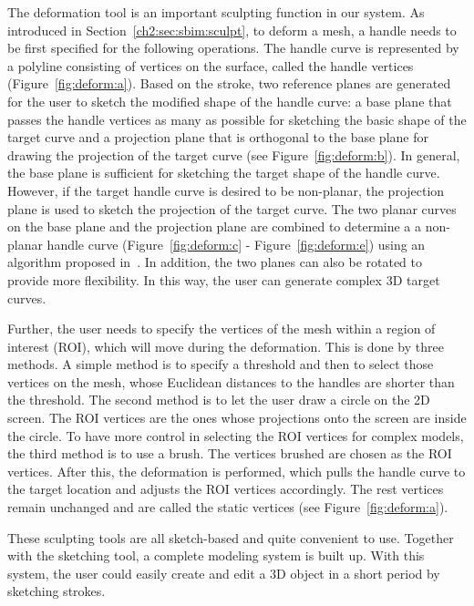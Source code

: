 The deformation tool is an important  sculpting function in our
system. As introduced in Section~\ref{ch2:sec:sbim:sculpt}, to
deform a mesh, a handle needs to be first specified for the
following operations. The handle curve is represented by a polyline 
consisting of vertices on the surface, called the handle vertices
(Figure~\ref{fig:deform:a}). Based on the stroke, two reference
planes are generated for the user to sketch the modified shape of
the handle curve: a base plane that passes the handle vertices as
many as possible for sketching the basic shape of the target curve
and a projection plane that is orthogonal to the base plane for
drawing the projection of the target curve (see
Figure~\ref{fig:deform:b}). In general, the base plane is sufficient
for sketching the target shape of the handle curve. However, if the
target handle curve is desired to be non-planar, the projection
plane is used to sketch the projection of the target curve. The two
planar curves on the base plane and the projection plane are
combined to determine a a non-planar handle curve
(Figure~\ref{fig:deform:c} - Figure~\ref{fig:deform:e}) using an
algorithm proposed in~\cite{CMZHB99}. In addition,  the two planes
can also be rotated to provide more flexibility. In this way, the
user can generate complex 3D target curves.

Further, the user needs to specify the vertices of the mesh within a
region of interest (ROI), which will move during the deformation.
This is done by three methods. A simple method is to specify a
threshold and  then to select those vertices on the mesh, whose
Euclidean distances to the handles are shorter than the threshold.
The second method is to let the user draw a circle on the 2D screen.
The ROI vertices are the ones whose projections onto the screen are
inside the circle. To have more control in selecting the ROI
vertices for complex models, the third method is to use a brush. The
vertices brushed are chosen as the ROI vertices. After this, the
deformation is performed, which pulls the handle curve to the target
location and adjusts the ROI vertices accordingly. The rest vertices
remain unchanged and are called the static vertices (see
Figure~\ref{fig:deform:a}).

These sculpting tools are all sketch-based and quite convenient to
use. Together with the sketching tool, a complete modeling system is
built up. With this system, the user could easily create and edit a
3D object in a short period by sketching strokes.


